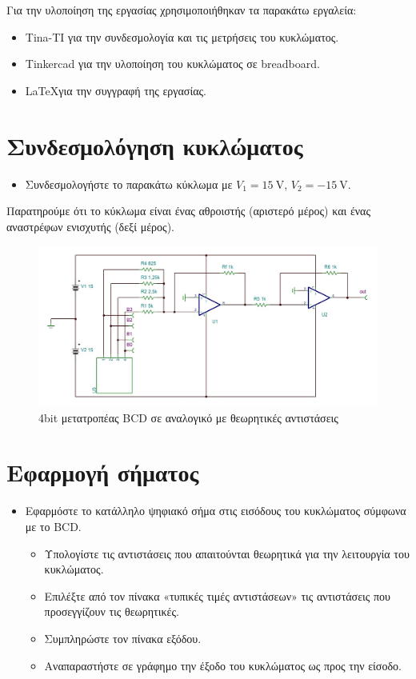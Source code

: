 \documentclass[12pt]{article}
\begin{document}
Για την υλοποίηση της εργασίας χρησιμοποιήθηκαν τα παρακάτω εργαλεία:
\begin{itemize}
	\item Tina-TI για την συνδεσμολογία και τις μετρήσεις του κυκλώματος.
	\item Tinkercad για την υλοποίηση του κυκλώματος σε breadboard.
	\item \LaTeX για την συγγραφή της εργασίας.
\end{itemize}

\section{Συνδεσμολόγηση κυκλώματος}

\begin{itemize}
	\item Συνδεσμολογήστε το παρακάτω κύκλωμα με $V_1 = \SI{15}{\volt}$,
		$V_2 = \SI{-15}{\volt}$.
\end{itemize}

Παρατηρούμε ότι το κύκλωμα είναι ένας αθροιστής (αριστερό μέρος) και ένας
αναστρέφων ενισχυτής (δεξί μέρος).

\begin{figure}[H]
	\centering
	\includegraphics[width=\linewidth]{./res/schem_theor.jpg}
	\caption{4bit μετατροπέας BCD σε αναλογικό με θεωρητικές αντιστάσεις}
\end{figure}

\section{Εφαρμογή σήματος}

\begin{itemize}
	\item Εφαρμόστε το κατάλληλο ψηφιακό σήμα στις εισόδους του κυκλώματος
		σύμφωνα με το BCD.
	\begin{itemize}
	\item Υπολογίστε τις αντιστάσεις που απαιτούνται θεωρητικά για την
		λειτουργία του κυκλώματος.
	\item Επιλέξτε από τον πίνακα «τυπικές τιμές αντιστάσεων» τις
		αντιστάσεις που προσεγγίζουν τις θεωρητικές.
	\item Συμπληρώστε τον πίνακα εξόδου.
	\item Αναπαραστήστε σε γράφημο την έξοδο του κυκλώματος ως προς την
		είσοδο.
	\end{itemize}
\end{itemize}
\end{document}
